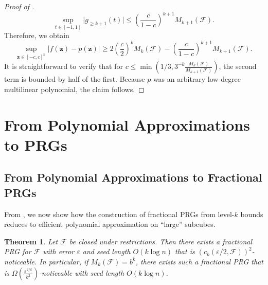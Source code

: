 \documentclass[10pt,a4paper]{article}
\newcommand{\eps}{\varepsilon}
\newtheorem{THM}[theorem]{Theorem}
\theoremstyle{definition}
\begin{document}
\begin{proof}[Proof of ]
\begin{equation*}
    \sup_{t\in [-1,1]} \vert g_{\geq k+1}(t)\vert\leq \left(\frac{c}{1-c}\right)^{k+1}M_{k+1}(\mathcal{F}).
\end{equation*}
Therefore, we obtain
\begin{equation*}
    \sup_{\mathbf{z}\in [-c,c]^n} \vert f(\mathbf{z})-p(\mathbf{z})\vert\geq 2\left(\frac{c}{2}\right)^kM_k(\mathcal{F})-\left(\frac{c}{1-c}\right)^{k+1}M_{k+1}(\mathcal{F}).
\end{equation*}
It is straightforward to verify that for $c\leq \min\left(1/3, 3^{-k}  \frac{M_k(\mathcal{F})}{M_{k+1}(\mathcal{F})}\right)$, the second term is bounded by half of the first. Because $p$ was an arbitrary low-degree multilinear polynomial, the claim follows.
\end{proof}



    \section{From Polynomial Approximations to PRGs}
    \label{sec:patoprg}
\subsection{From Polynomial Approximations to Fractional PRGs}
From , we now show how the construction of fractional PRGs from level-$k$ bounds reduces to efficient polynomial approximation on ``large'' subcubes.
    \begin{THM}
    \label{thm:mkfprg}
        Let $\mathcal{F}$ be closed under restrictions. Then there exists a fractional PRG for $\mathcal{F}$ with error $\eps$ and seed length $O(k\log n)$ that is $\left(c_k(\eps/2,\mathcal{F})\right)^2$-noticeable. In particular, if $M_k(\mathcal{F})=b^k$, there exists such a fractional PRG that is $\Omega\left(\frac{\eps^{2/k}}{b^2}\right)$-noticeable with seed length $O(k\log n)$.
\end{THM}
\end{document}
